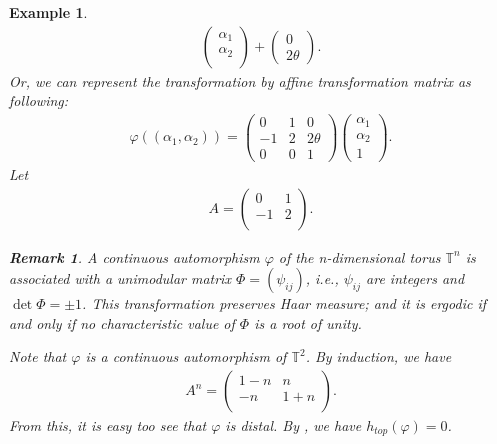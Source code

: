 \documentclass[a4paper,10pt]{amsart}
\newtheorem{example}{Example}[section]
\newtheorem{remark}{Remark}[section]
\newcommand{\T}{\mathbb T} %
\begin{document}
\begin{example}
\begin{align*}
\begin{pmatrix}
           \alpha_1 \\
           \alpha_2 \\
        \end{pmatrix} + 
        \begin{pmatrix}
           0 \\
           2\theta
        \end{pmatrix}.
    \end{align*}
    Or, we can represent the transformation by affine transformation 
    matrix as following:
    \begin{align*}
        \varphi((\alpha_1, \alpha_2)) = 
        \begin{pmatrix}
            0 & 1 & 0 \\
            -1 & 2 & 2\theta \\
            0 & 0 & 1
        \end{pmatrix}
        \begin{pmatrix}
           \alpha_1 \\
           \alpha_2 \\
           1
        \end{pmatrix}.
    \end{align*}
    Let 
    \begin{align*}
        A = \begin{pmatrix}
            0 & 1 \\
            -1 & 2\\
        \end{pmatrix}.
    \end{align*} 

    \begin{remark}
       A continuous automorphism $\varphi$ of the n-dimensional torus
       $\T^{n}$ is associated with a unimodular matrix 
       $\varPhi = (\psi_{ij})$, i.e., $\psi_{ij}$ are integers and
       $\det \varPhi = \pm 1$. This transformation preserves Haar 
       measure; and it is ergodic if and only if no characteristic 
       value of $\varPhi$ is a root of unity.
    \end{remark}

    Note that $\varphi$ is a continuous automorphism of $\T^{2}$. 
    By induction, we have
    \begin{align*}
        A^{n} = \begin{pmatrix}
            1-n & n \\
            -n & 1 + n\\
        \end{pmatrix}. 
    \end{align*}
    From this, it is easy too see that $\varphi$ is distal.
    By \cite{NA}, we have $h_{top}(\varphi) = 0$.
\end{example}
\end{document}
